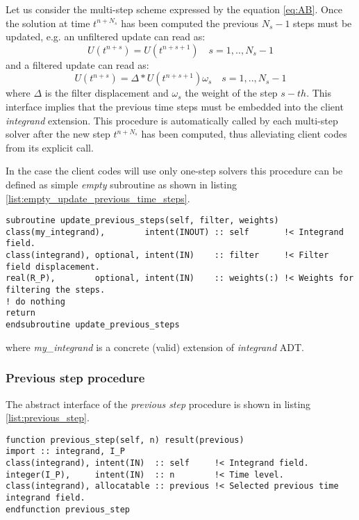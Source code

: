 \documentclass[pdftex,preprint,3p,times,numbers]{elsarticle}
\begin{document}
Let us consider the multi-step scheme expressed by the equation \ref{eq:AB}. Once the solution at time $t^{n+N_s}$ has been computed the previous $N_s-1$ steps must be updated, e.g. an unfiltered update can read as:
\begin{equation}
U\left(t^{n+s}\right) = U\left(t^{n+s+1}\right)\quad s=1,..,N_s-1
\label{eq:previous-steps-update}
\end{equation}
and a filtered update can read as:
\begin{equation}
U\left(t^{n+s}\right) = \Delta * U\left(t^{n+s+1}\right) \omega_s\quad s=1,..,N_s-1
\label{eq:previous-steps-update-filtered}
\end{equation}
where $\Delta$ is the filter displacement and $\omega_s$ the weight of the step $s-th$. This interface implies that the previous time steps must be embedded into the client \emph{integrand} extension. This procedure is automatically called by each multi-step solver after the new step $t^{n+N_s}$ has been computed, thus alleviating client codes from its explicit call.

In the case the client codes will use only one-step solvers this procedure can be defined as simple \emph{empty} subroutine as shown in listing \ref{list:empty_update_previous_time_steps}.

\begin{lstlisting}[firstnumber=1,style=code,caption={empty implementation of the update previous time steps procedure},label={list:empty_update_previous_time_steps}]
subroutine update_previous_steps(self, filter, weights)
class(my_integrand),        intent(INOUT) :: self       !< Integrand field.
class(integrand), optional, intent(IN)    :: filter     !< Filter field displacement.
real(R_P),        optional, intent(IN)    :: weights(:) !< Weights for filtering the steps.
! do nothing
return
endsubroutine update_previous_steps
\end{lstlisting}
where \emph{my\_integrand} is a concrete (valid) extension of \emph{integrand} ADT.

\subsubsection{Previous step procedure}

The abstract interface of the \emph{previous step} procedure is shown in listing \ref{list:previous_step}.

\begin{lstlisting}[firstnumber=1,style=code,caption={previous step procedure interface},label={list:previous_step}]
function previous_step(self, n) result(previous)
import :: integrand, I_P
class(integrand), intent(IN)  :: self     !< Integrand field.
integer(I_P),     intent(IN)  :: n        !< Time level.
class(integrand), allocatable :: previous !< Selected previous time integrand field.
endfunction previous_step
\end{lstlisting}
\end{document}
